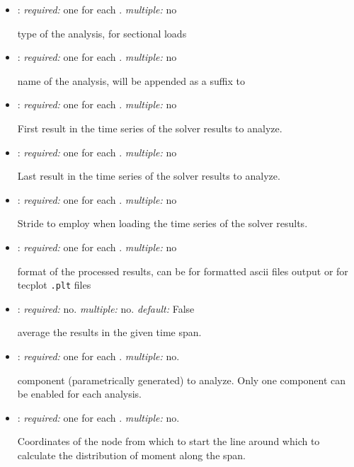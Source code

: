 \begin{itemize}
\item {}: \textit{required:} one for each . \textit{multiple:} no

type of the analysis,  for sectional loads

\item {}: \textit{required:} one for each . \textit{multiple:} no

name of the analysis, will be appended as a suffix to 

\item {}: \textit{required:} one for each . 
\textit{multiple:} no

First result in the time series of the solver results to analyze.

\item {}: \textit{required:} one for each . 
\textit{multiple:} no

Last result in the time series of the solver results to analyze.

\item {}: \textit{required:} one for each . 
\textit{multiple:} no

Stride to employ when loading the time series of the solver results. 

\item {}: \textit{required:} one for each . 
\textit{multiple:} no

format of the processed results, can be  for formatted ascii files 
output or  for tecplot \texttt{.plt} files

\item {}: \textit{required:} no. \textit{multiple:} no. 
\textit{default:} False

average the results in the given time span.

\item {}: \textit{required:} one for each . 
\textit{multiple:} no.

component (parametrically generated) to analyze. Only one component can be 
enabled for each analysis. 

\item {}: \textit{required:} one for each . 
\textit{multiple:} no.

Coordinates of the node from which to start the line around which to calculate 
the distribution of moment along the span.


\end{itemize}
